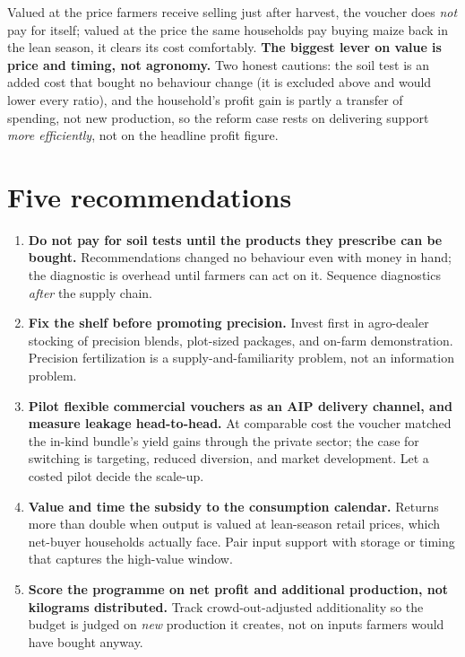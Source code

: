 \documentclass[10pt]{article}
\begin{document}
\noindent Valued at the price farmers receive selling just after harvest, the voucher does \emph{not} pay for itself; valued at the price the same households pay buying maize back in the lean season, it clears its cost comfortably. \textbf{The biggest lever on value is price and timing, not agronomy.} Two honest cautions: the soil test is an added cost that bought no behaviour change (it is excluded above and would lower every ratio), and the household's profit gain is partly a transfer of spending, not new production, so the reform case rests on delivering support \emph{more efficiently}, not on the headline profit figure.

\section{Five recommendations}
\begin{enumerate}
\item \textbf{Do not pay for soil tests until the products they prescribe can be bought.} Recommendations changed no behaviour even with money in hand; the diagnostic is overhead until farmers can act on it. Sequence diagnostics \emph{after} the supply chain.
\item \textbf{Fix the shelf before promoting precision.} Invest first in agro-dealer stocking of precision blends, plot-sized packages, and on-farm demonstration. Precision fertilization is a supply-and-familiarity problem, not an information problem.
\item \textbf{Pilot flexible commercial vouchers as an AIP delivery channel, and measure leakage head-to-head.} At comparable cost the voucher matched the in-kind bundle's yield gains through the private sector; the case for switching is targeting, reduced diversion, and market development. Let a costed pilot decide the scale-up.
\item \textbf{Value and time the subsidy to the consumption calendar.} Returns more than double when output is valued at lean-season retail prices, which net-buyer households actually face. Pair input support with storage or timing that captures the high-value window.
\item \textbf{Score the programme on net profit and additional production, not kilograms distributed.} Track crowd-out-adjusted additionality so the budget is judged on \emph{new} production it creates, not on inputs farmers would have bought anyway.
\end{enumerate}
\end{document}
